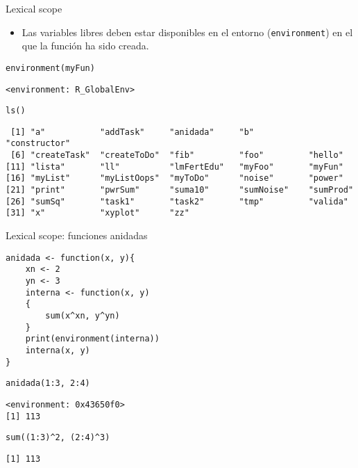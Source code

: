 \documentclass[xcolor={usenames,svgnames,dvipsnames}]{beamer}
\begin{document}
\begin{frame}[fragile,label={sec:orgheadline14}]{Lexical scope}
 \begin{itemize}
\item Las variables libres deben estar disponibles en el entorno
(\texttt{environment}) en el que la función ha sido creada.
\end{itemize}
\lstset{language=R,label= ,caption= ,captionpos=b,numbers=none}
\begin{lstlisting}
environment(myFun)
\end{lstlisting}

\begin{verbatim}
<environment: R_GlobalEnv>
\end{verbatim}

\lstset{language=R,label= ,caption= ,captionpos=b,numbers=none}
\begin{lstlisting}
ls()
\end{lstlisting}

\begin{verbatim}
 [1] "a"           "addTask"     "anidada"     "b"           "constructor"
 [6] "createTask"  "createToDo"  "fib"         "foo"         "hello"      
[11] "lista"       "ll"          "lmFertEdu"   "myFoo"       "myFun"      
[16] "myList"      "myListOops"  "myToDo"      "noise"       "power"      
[21] "print"       "pwrSum"      "suma10"      "sumNoise"    "sumProd"    
[26] "sumSq"       "task1"       "task2"       "tmp"         "valida"     
[31] "x"           "xyplot"      "zz"
\end{verbatim}
\end{frame}

\begin{frame}[fragile,label={sec:orgheadline15}]{Lexical scope: funciones anidadas}
 \lstset{language=R,label= ,caption= ,captionpos=b,numbers=none}
\begin{lstlisting}
anidada <- function(x, y){
    xn <- 2
    yn <- 3
    interna <- function(x, y)
    {
        sum(x^xn, y^yn)
    }
    print(environment(interna))
    interna(x, y)
}
\end{lstlisting}

\lstset{language=R,label= ,caption= ,captionpos=b,numbers=none}
\begin{lstlisting}
anidada(1:3, 2:4)
\end{lstlisting}

\begin{verbatim}
<environment: 0x43650f0>
[1] 113
\end{verbatim}

\lstset{language=R,label= ,caption= ,captionpos=b,numbers=none}
\begin{lstlisting}
sum((1:3)^2, (2:4)^3)
\end{lstlisting}

\begin{verbatim}
[1] 113
\end{verbatim}
\end{frame}
\end{document}
